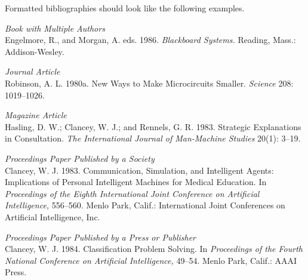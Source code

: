 \documentclass[letterpaper]{article} %
\begin{document}



Formatted bibliographies should look like the following examples.

\smallskip \noindent \textit{Book with Multiple Authors}\\
Engelmore, R., and Morgan, A. eds. 1986. \textit{Blackboard Systems.} Reading, Mass.: Addison-Wesley.

\smallskip \noindent \textit{Journal Article}\\
Robinson, A. L. 1980a. New Ways to Make Microcircuits Smaller. \textit{Science} 208: 1019--1026.

\smallskip \noindent \textit{Magazine Article}\\
Hasling, D. W.; Clancey, W. J.; and Rennels, G. R. 1983. Strategic Explanations in Consultation. \textit{The International Journal of Man-Machine Studies} 20(1): 3--19.

\smallskip \noindent \textit{Proceedings Paper Published by a Society}\\
Clancey, W. J. 1983. Communication, Simulation, and Intelligent Agents: Implications of Personal Intelligent Machines for Medical Education. In \textit{Proceedings of the Eighth International Joint Conference on Artificial Intelligence,} 556--560. Menlo Park, Calif.: International Joint Conferences on Artificial Intelligence, Inc.

\smallskip \noindent \textit{Proceedings Paper Published by a Press or Publisher}\\
Clancey, W. J. 1984. Classification Problem Solving. In \textit{Proceedings of the Fourth National Conference on Artificial Intelligence,} 49--54. Menlo Park, Calif.: AAAI Press.
\end{document}

